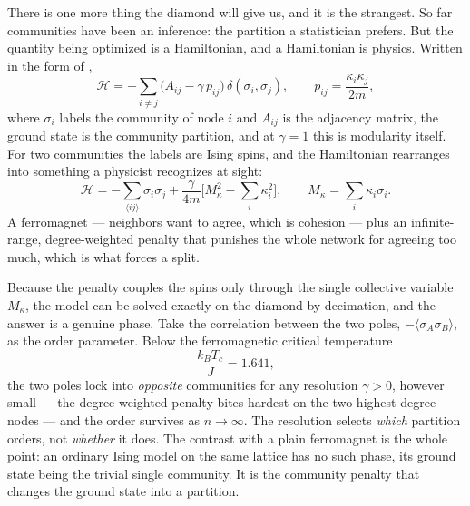 There is one more thing the diamond will give us, and it is the strangest. So far
communities have been an inference: the partition a statistician prefers. But the
quantity being optimized is a Hamiltonian, and a Hamiltonian is physics. Written
in the form of \citet{reichardt2004},
\begin{equation}
  \mathcal{H} = -\sum_{i\neq j}\big(A_{ij}-\gamma\,p_{ij}\big)\,\delta(\sigma_i,\sigma_j),
  \qquad p_{ij} = \frac{\kappa_i\kappa_j}{2m},
  \label{eq:com-rbH}
\end{equation}
where $\sigma_i$ labels the community of node $i$ and $A_{ij}$ is the adjacency
matrix, the ground state is the community partition, and at $\gamma=1$ this is
modularity itself. For two communities the labels are Ising spins, and the
Hamiltonian rearranges into something a physicist recognizes at sight:
\begin{equation}
  \mathcal{H} = -\sum_{\langle ij\rangle}\sigma_i\sigma_j
  + \frac{\gamma}{4m}\Big[M_\kappa^2 - \sum_i \kappa_i^2\Big],
  \qquad
  M_\kappa = \sum_i \kappa_i\sigma_i .
  \label{eq:com-rbIsing}
\end{equation}
A ferromagnet --- neighbors want to agree, which is cohesion --- plus an
infinite-range, degree-weighted penalty that punishes the whole network for
agreeing too much, which is what forces a split.

Because the penalty couples the spins only through the single collective variable
$M_\kappa$, the model can be solved exactly on the diamond by decimation, and the
answer is a genuine phase. Take the correlation between the two poles,
$-\langle\sigma_A\sigma_B\rangle$, as the order parameter. Below the ferromagnetic
critical temperature
\begin{equation}
  \frac{k_B T_c}{J} = 1.641,
  \label{eq:com-Tc}
\end{equation}
the two poles lock into \emph{opposite} communities for any resolution $\gamma>0$,
however small --- the degree-weighted penalty bites hardest on the two
highest-degree nodes --- and the order survives as $n\to\infty$. The resolution
selects \emph{which} partition orders, not \emph{whether} it does. The contrast
with a plain ferromagnet is the whole point: an ordinary Ising model on the same
lattice has no such phase, its ground state being the trivial single community. It
is the community penalty that changes the ground state into a partition.

